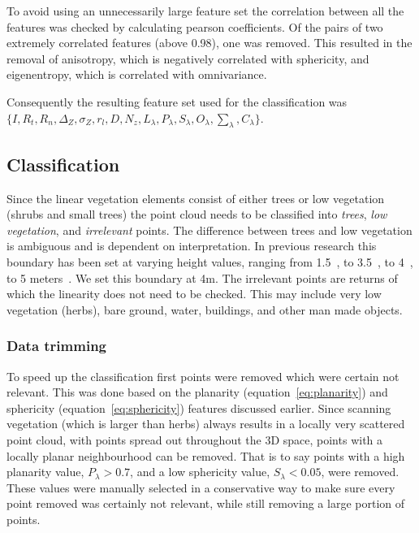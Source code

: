 {To avoid using an unnecessarily large feature set the correlation between all the features was checked by calculating pearson coefficients. Of the pairs of two extremely correlated features (above 0.98), one was removed. This resulted in the removal of anisotropy, which is negatively correlated with sphericity, and eigenentropy, which is correlated with omnivariance.

Consequently the resulting feature set used for the classification was \(\{I, R_{t}, R_{n}, \Delta_{Z}, \sigma_{Z}, r_{l}, D, N_{z}, L_{\lambda}, P_{\lambda}, S_{\lambda}, O_{\lambda}, \sum_{\lambda}, C_{\lambda}\}\).

\subsection{Classification}
\label{sec:class}
Since the linear vegetation elements consist of either trees or low vegetation (shrubs and small trees) the point cloud needs to be classified into \textit{trees}, \textit{low vegetation}, and \textit{irrelevant} points. The difference between trees and low vegetation is ambiguous and is dependent on interpretation. In previous research this boundary has been set at varying height values, ranging from 1.5~\citep{bork2007integrating}, to 3.5~\citep{antonarakis2008object}, to 4~\citep{koukoulas2005spatial}, to 5 meters~\citep{khosravipour2014generating}. We set this boundary at 4m. The irrelevant points are returns of which the linearity does not need to be checked. This may include very low vegetation (herbs), bare ground, water, buildings, and other man made objects.

\subsubsection{Data trimming}
To speed up the classification first points were removed which were certain not relevant. This was done based on the planarity (equation~\ref{eq:planarity}) and sphericity (equation~\ref{eq:sphericity}) features discussed earlier. Since scanning vegetation (which is larger than herbs) always results in a locally very scattered point cloud, with points spread out throughout the 3D space, points with a locally planar neighbourhood can be removed. That is to say points with a high planarity value, \(P_{\lambda} > 0.7\), and a low sphericity value, \(S_{\lambda} < 0.05\), were removed. These values were manually selected in a conservative way to make sure every point removed was certainly not relevant, while still removing a large portion of points.
 
}
